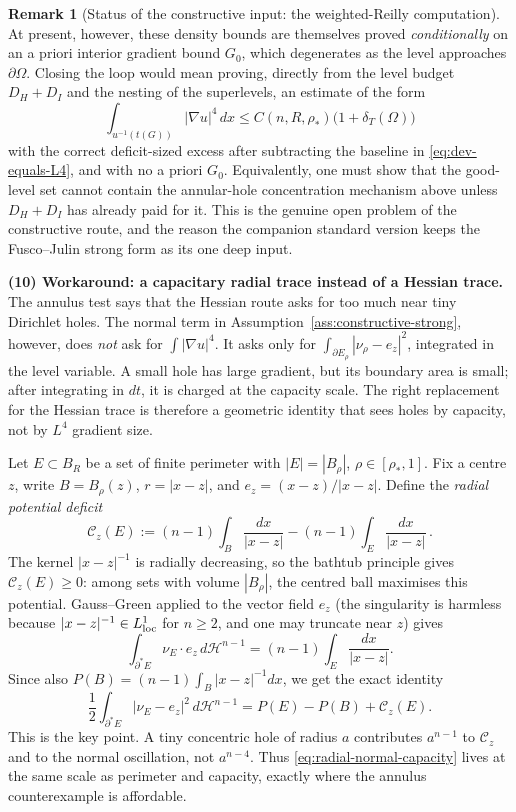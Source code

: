 \documentclass[11pt]{amsart}
\theoremstyle{definition}
\newtheorem{remark}[theorem]{Remark}
\newcommand{\Om}{\Omega}
\newcommand{\dT}{\delta_T}
\newcommand{\rstar}{\rho_*}
\newcommand{\Hn}{\mathcal H^{n-1}}
\begin{document}
\begin{remark}[Status of the constructive input: the weighted-Reilly computation]
At present, however, these density bounds are themselves proved
\emph{conditionally} on an a priori interior gradient bound \(G_0\), which
degenerates as the level approaches \(\partial\Om\).  Closing the loop would mean
proving, directly from the level budget \(D_H+D_I\) and the nesting of the
superlevels, an estimate of the form
\[
   \int_{u^{-1}(t(G))}|\nabla u|^4\,dx
   \le C(n,R,\rstar)\bigl(1+\dT(\Om)\bigr)
\]
with the correct deficit-sized excess after subtracting the baseline in
\eqref{eq:dev-equals-L4}, and with no a priori \(G_0\).  Equivalently, one must
show that the good-level set cannot contain the annular-hole concentration
mechanism above unless \(D_H+D_I\) has already paid for it.  This is the genuine
open problem of the constructive route, and the reason the companion standard
version keeps the Fusco--Julin strong form as its one deep input.

\medskip
\noindent\textbf{(10) Workaround: a capacitary radial trace instead of a Hessian trace.}
The annulus test says that the Hessian route asks for too much near tiny
Dirichlet holes.  The normal term in Assumption~\ref{ass:constructive-strong},
however, does \emph{not} ask for \(\int |\nabla u|^4\).  It asks only for
\(\int_{\partial E_\rho}|\nu_\rho-e_z|^2\), integrated in the level variable.  A
small hole has large gradient, but its boundary area is small; after integrating
in \(dt\), it is charged at the capacity scale.  The right replacement for the
Hessian trace is therefore a geometric identity that sees holes by capacity, not
by \(L^4\) gradient size.

Let \(E\subset B_R\) be a set of finite perimeter with
\(|E|=|B_\rho|\), \(\rho\in[\rstar,1]\).  Fix a centre \(z\), write
\(B=B_\rho(z)\), \(r=|x-z|\), and \(e_z=(x-z)/|x-z|\).  Define the
\emph{radial potential deficit}
\[
   \mathcal C_z(E)
   :=(n-1)\int_{B}\frac{dx}{|x-z|}
     -(n-1)\int_E\frac{dx}{|x-z|}\, .
\]
The kernel \(|x-z|^{-1}\) is radially decreasing, so the bathtub principle gives
\(\mathcal C_z(E)\ge0\): among sets with volume \(|B_\rho|\), the centred ball
maximises this potential.  Gauss--Green applied to the vector field \(e_z\)
(the singularity is harmless because \(|x-z|^{-1}\in L^1_{\rm loc}\) for
\(n\ge2\), and one may truncate near \(z\)) gives
\[
   \int_{\partial^*E}\nu_E\cdot e_z\,d\Hn
   =(n-1)\int_E\frac{dx}{|x-z|}.
\]
Since also \(P(B)=(n-1)\int_B|x-z|^{-1}dx\), we get the exact identity
\begin{equation}\label{eq:radial-normal-capacity}
   \frac12\int_{\partial^*E}|\nu_E-e_z|^2\,d\Hn
   =P(E)-P(B)+\mathcal C_z(E).
\end{equation}
This is the key point.  A tiny concentric hole of radius \(a\) contributes
\(a^{n-1}\) to \(\mathcal C_z\) and to the normal oscillation, not
\(a^{n-4}\).  Thus \eqref{eq:radial-normal-capacity} lives at the same scale as
perimeter and capacity, exactly where the annulus counterexample is affordable.


\end{remark}
\end{document}
